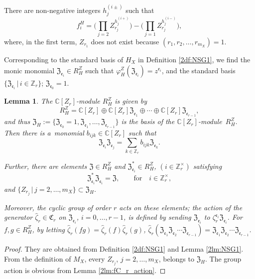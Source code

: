 \documentclass[10pt,a4paper]{amsart}
\def\CC{{\mathbb C}}
\def\ZZ{{\mathbb Z}}
\def\fC{{\mathfrak C}}
\def\fZ{{\mathfrak Z}}
\def\fe{{\mathfrak e}}
\def\hzeta{{\widehat \zeta}}
\numberwithin{equation}{section}
\newtheorem{Lemma}[Theorem]{Lemma}
\begin{document}
There are non-negative integers $h_j^{(i\pm)}$ such that
\begin{equation}
f^H_i =
\bigg(
\prod_{j=2} Z_{r_j}^{h_j^{(i+)}}
\bigg)
-\bigg(
\prod_{j=1} Z_{r_j}^{h_j^{(i-)}}
\bigg),
\label{2eq:f^H_iZ}
\end{equation}
where, in the first term, $Z_{r_1}$ does not exist because $(r_1, r_2, \dots, r_{m_X})=1$.





Corresponding to the standard basis of $H_X$ in Definition \ref{2df:NSG1}, we find the monic monomial $\fZ_{\fe_i} \in R_H^Z$ such that $\varphi^Z_H(\fZ_{\fe_i}) = z^{\fe_i}$, and the standard basis $\{\fZ_{\fe_i}\, |\, i \in \ZZ_r\}$; $\fZ_{\fe_0}=1$.

\begin{Lemma}\label{2lm:Z_standardbasis}
The $\CC[Z_r]$-module $R_H^Z$ is given by
\[
R_H^Z=\CC[Z_r]\oplus \CC[Z_r]\fZ_{\fe_1}\oplus \cdots
\oplus \CC[Z_r]\fZ_{\fe_{r-1}},
\]
and thus $\fZ_H:=\{\fZ_{\fe_0}=1, \fZ_{\fe_1}, \dots, \fZ_{\fe_{r-1}}\}$ is the basis of the $\CC[Z_r]$-module~$R_H^Z$.
Then there is a~monomial $b_{i j k}\in \CC[Z_r]$ such that
\[
\fZ_{\fe_i}\fZ_{\fe_j}
=\sum_{k\in \ZZ_r}b_{i j k}\fZ_{\fe_k}.
\]

Further, there are elements $\fZ\in R_H^Z$ and $\fZ_{\fe_i}^*\in R_H^Z$, $(i\in \ZZ_r^\times)$ satisfying
\[
 \fZ_{\fe_i}^* \fZ_{\fe_i}=\fZ, \qquad \text{for} \quad
 i \in \ZZ_r^\times,
\]
and $\{Z_{r_j} \, |\, j=2, \dots, m_X\}\subset \fZ_H$.

Moreover, the cyclic group of order $r$ acts on these elements;
the action of the generator $\hzeta_r \in \fC_r$ on $\fZ_{\fe_i}$, $i=0, \dots, r-1$, is defined by sending $\fZ_{\fe_i}$ to $\zeta_r^{\fe_i}\fZ_{\fe_i}$.
For $f, g \in R_H^Z$, by letting $\hzeta_r (f g) =\hzeta_r (f)\hzeta_r (g)$, $\hzeta_r(\fZ_{\fe_1}\fZ_{\fe_2}\cdots\fZ_{\fe_{r-1}})=\fZ_{\fe_1}\fZ_{\fe_2}\cdots\fZ_{\fe_{r-1}}$.
\end{Lemma}

\begin{proof}
They are obtained from Definition \ref{2df:NSG1} and Lemma \ref{2lm:NSG1}.
From the definition of $M_X$, every $Z_{r_j}$, $j=2, \dots, m_X$, belongs to $\fZ_H$. The group action is obvious from Lemma \ref{2lm:fC_r_action}.
\end{proof}
\end{document}
